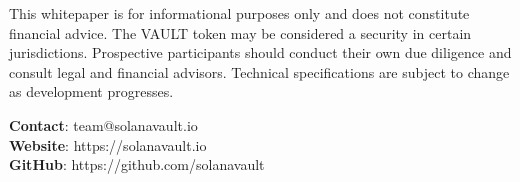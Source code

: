 \documentclass[12pt,a4paper]{article}
\begin{document}
This whitepaper is for informational purposes only and does not constitute financial advice. The VAULT token may be considered a security in certain jurisdictions. Prospective participants should conduct their own due diligence and consult legal and financial advisors. Technical specifications are subject to change as development progresses.

\vspace{1cm}
\begin{center}
\textbf{Contact}: team@solanavault.io\\
\textbf{Website}: https://solanavault.io\\
\textbf{GitHub}: https://github.com/solanavault
\end{center}
\end{document}
